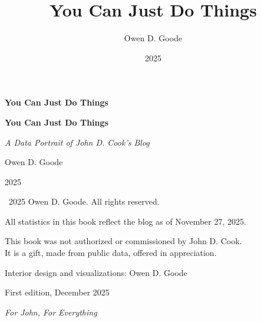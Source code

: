 \documentclass[10pt,openright]{memoir}
\title{You Can Just Do Things}
\author{Owen D. Goode}
\date{2025}
\begin{document}
\frontmatter
\pagestyle{empty}

\begin{center}
\vspace*{3in}
{\LARGE\bfseries You Can Just Do Things}
\vfill
\end{center}
\clearpage

\thispagestyle{empty}\mbox{}
\clearpage

\begin{center}
\vspace*{2in}
{\Huge\bfseries You Can Just Do Things}

\vspace{0.5in}
{\large\itshape A Data Portrait of John D. Cook's Blog}

\vspace{2in}
{\large Owen D. Goode}

\vfill
{\small 2025}
\end{center}
\clearpage

\vspace*{\fill}
\begin{flushleft}
\small
\textcopyright\ 2025 Owen D. Goode. All rights reserved.

\vspace{1em}
All statistics in this book reflect the blog as of November 27, 2025.

\vspace{1em}
This book was not authorized or commissioned by John D. Cook.\\
It is a gift, made from public data, offered in appreciation.

\vspace{1em}
Interior design and visualizations: Owen D. Goode

\vspace{1em}
First edition, December 2025
\end{flushleft}
\clearpage

\vspace*{3in}
\begin{center}
\itshape
For John, For Everything
\end{center}
\clearpage

\end{document}
